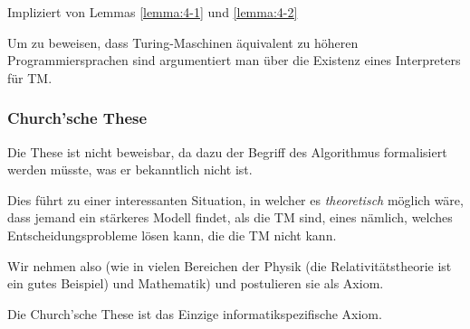 \inlineproof Impliziert von Lemmas \ref{lemma:4-1} und \ref{lemma:4-2}

Um zu beweisen, dass Turing-Maschinen äquivalent zu höheren Programmiersprachen sind argumentiert man über die Existenz eines Interpreters für TM.


\subsubsection{Church'sche These}
\begin{center}
\end{center}
Die These ist nicht beweisbar, da dazu der Begriff des Algorithmus formalisiert werden müsste, was er bekanntlich nicht ist.

Dies führt zu einer interessanten Situation, in welcher es \textit{theoretisch} möglich wäre, dass jemand ein stärkeres Modell findet, als die TM sind,
eines nämlich, welches Entscheidungsprobleme lösen kann, die die TM nicht kann.

Wir nehmen also (wie in vielen Bereichen der Physik (die Relativitätstheorie ist ein gutes Beispiel) und Mathematik) und postulieren sie als Axiom.

 Die Church'sche These ist das Einzige informatikspezifische Axiom.
